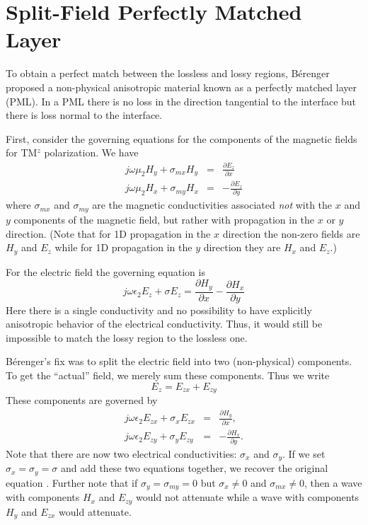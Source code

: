 \section{Split-Field Perfectly Matched Layer}

To obtain a perfect match between the lossless and lossy regions,
B\'{e}renger proposed a non-physical anisotropic material known as a
perfectly matched layer (PML).  In a PML there is no loss in the
direction tangential to the interface but there is loss normal to the
interface.

First, consider the governing equations for the components of the
magnetic fields for TM$^z$ polarization.  We have
\begin{eqnarray}
  j\omega\mu_2 H_y + \sigma_{mx} H_y &=& \frac{\partial E_z}{\partial x} \\
  j\omega\mu_2 H_x + \sigma_{my} H_x &=& -\frac{\partial E_z}{\partial y}
\end{eqnarray}
where $\sigma_{mx}$ and $\sigma_{my}$ are the magnetic conductivities
associated {\em not} with the $x$ and $y$ components of the magnetic
field, but rather with propagation in the $x$ or $y$ direction.  (Note
that for 1D propagation in the $x$ direction the non-zero fields are
$H_y$ and $E_z$ while for 1D propagation in the $y$ direction they are
$H_x$ and $E_z$.)

For the electric field the governing equation is
\begin{equation}
  j\omega\epsilon_2 E_z + \sigma E_z = 
  \frac{\partial H_y}{\partial x} - \frac{\partial H_x}{\partial y}
  \label{eq:pmlEBeforeSplit}
\end{equation}
Here there is a single conductivity and no possibility to have explicitly
anisotropic behavior of the electrical conductivity.  Thus, it would
still be impossible to match the lossy region to the lossless one.

B\'{e}renger's fix was to split the electric field into two
(non-physical) components.  To get the ``actual'' field, we merely sum
these components.  Thus we write
\begin{equation}
  E_z = E_{zx} + E_{zy}
\end{equation}
These components are governed by 
\begin{eqnarray}
  j\omega\epsilon_2 E_{zx} + \sigma_x E_{zx} &=& \frac{\partial H_y}{\partial x},  \\
  j\omega\epsilon_2 E_{zy} + \sigma_y E_{zy} &=& -\frac{\partial H_x}{\partial y}.
\end{eqnarray}
Note that there are now two electrical conductivities: $\sigma_x$ and
$\sigma_y$.  If we set $\sigma_x = \sigma_y = \sigma$ and add these
two equations together, we recover the original equation
.  Further note that if
$\sigma_y=\sigma_{my}=0$ but $\sigma_x\neq 0$ and $\sigma_{mx}\neq 0$,
then a wave with components $H_x$ and $E_{zy}$ would not attenuate
while a wave with components $H_y$ and $E_{zx}$ would attenuate.

